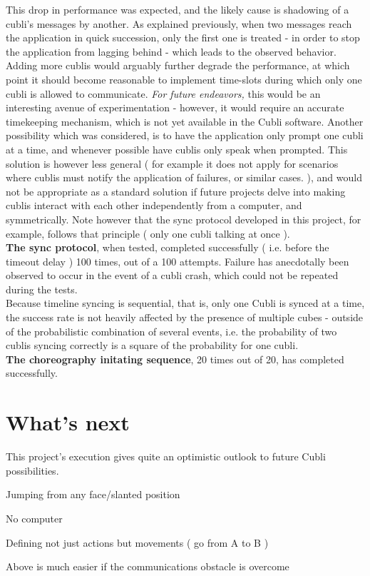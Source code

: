 This drop in performance was expected, and the likely cause is shadowing of a cubli's messages by another. As explained previously, when two messages reach the application in quick succession, only the first one is treated - in order to stop the application from lagging behind - which leads to the observed behavior. \\

Adding more cublis would arguably further degrade the performance, at which point it should become reasonable to implement time-slots during which only one cubli is allowed to communicate. \textit{ For future endeavors, } this would be an interesting avenue of experimentation - however, it would require an accurate timekeeping mechanism, which is not yet available in the Cubli software. Another possibility which was considered, is to have the application only prompt one cubli at a time, and whenever possible have cublis only speak when prompted. This solution is however less general ( for example it does not apply for scenarios where cublis must notify the application of failures, or similar cases. ), and would not be appropriate as a standard solution if future projects delve into making cublis interact with each other independently from a computer, and symmetrically. Note however that the sync protocol developed in this project, for example, follows that principle ( only one cubli talking at once ). \\

\textbf{The sync protocol}, when tested, completed successfully ( i.e. before the timeout delay ) 100 times, out of a 100 attempts. Failure has anecdotally been observed to occur in the event of a cubli crash, which could not be repeated during the tests.\\

Because timeline syncing is sequential, that is, only one Cubli is synced at a time, the success rate is not heavily affected by the presence of multiple cubes - outside of the probabilistic combination of several events, i.e. the probability of two cublis syncing correctly is a square of the probability for one cubli.\\

\textbf{The choreography initating sequence}, 20 times out of 20, has completed successfully.

\section{What's next}

This project's execution gives quite an optimistic outlook to future Cubli possibilities.

Jumping from any face/slanted position

No computer

Defining not just actions but movements ( go from A to B )

Above is much easier if the communications obstacle is overcome


